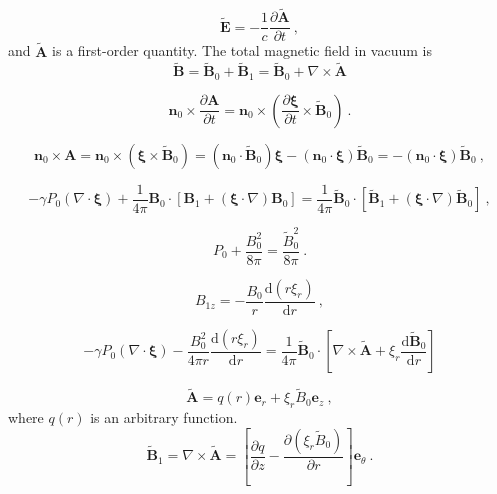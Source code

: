 \documentclass[12pt,a4paper]{article}
\renewcommand{\vec}[1]{\boldsymbol{#1}}
\newcommand{\dif}{\mathrm{d}}
\begin{document}
\begin{equation*}
 \vec{\tilde{E}} = -\dfrac{1}{c} \dfrac{\partial \vec{\tilde{A}}}{\partial t} ~,
\end{equation*}
and $\vec{\tilde{A}}$ is a first-order quantity. The total magnetic field in vacuum is
\begin{equation*}
 \vec{\tilde{B}} = \vec{\tilde{B}}_0 +\vec{\tilde{B}}_1 = \vec{\tilde{B}}_0 +\nabla \times \vec{\tilde{A}}
\end{equation*}

\begin{equation}
\vec{n}_0 \times \dfrac{\partial \vec{A}}{\partial t} = \vec{n}_0 \times \left(\dfrac{\partial \vec{\xi}}{\partial t} \times \vec{\tilde{B}}_0 \right) ~.
\end{equation}

\begin{equation}
\vec{n}_0 \times \vec{A} = \vec{n}_0 \times (\vec{\xi} \times \vec{\tilde{B}}_0) = (\vec{n}_0 \cdot \vec{\tilde{B}}_0) \vec{\xi} -(\vec{n}_0 \cdot \vec{\xi} )\vec{\tilde{B}}_0 = -(\vec{n}_0 \cdot \vec{\xi}) \vec{\tilde{B}}_0 ~,
\end{equation}


\begin{equation*}
-\gamma P_0(\nabla \cdot \vec{\xi}) +\dfrac{1}{4\pi} \vec{B}_0\cdot [\vec{B}_1 +(\vec{\xi} \cdot \nabla)\vec{B}_0] =\dfrac{1}{4\pi}  \vec{\tilde{B}}_0 \cdot [\vec{\tilde{B}}_1 +(\vec{\xi} \cdot \nabla)\vec{\tilde{B}}_0] ~,
\end{equation*}


\begin{equation*}
P_0 +\dfrac{B_0^2}{8\pi} = \dfrac{\tilde{B}_0^2}{8\pi} ~.
\end{equation*}


\begin{equation*}
B_{1z} = -\dfrac{B_0}{r} \dfrac{\dif (r\xi_r)}{\dif r} ~,
\end{equation*}

 
\begin{equation}
-\gamma P_0 (\nabla \cdot \vec{\xi}) -\dfrac{B_0^2}{4\pi r} \dfrac{\dif (r\xi_r)}{\dif r} = \dfrac{1}{4\pi} \vec{\tilde{B}}_0\cdot \left[\nabla \times \vec{\tilde{A}} +\xi_r \dfrac{\dif \vec{\tilde{B}}_0}{\dif r} \right]
\end{equation}


\begin{equation*}
\vec{\tilde{A}} = q(r) \vec{e}_r + \xi_r \tilde{B}_0 \vec{e}_z ~,
\end{equation*}
where $q(r)$ is an arbitrary function.
\begin{equation}
\vec{\tilde{B}}_1 = \nabla \times \vec{\tilde{A}} = \left[\dfrac{\partial q}{\partial z}  -\dfrac{\partial (\xi_r \tilde{B}_0)}{\partial r} \right] \vec{e}_\theta ~.
\end{equation}
\end{document}
